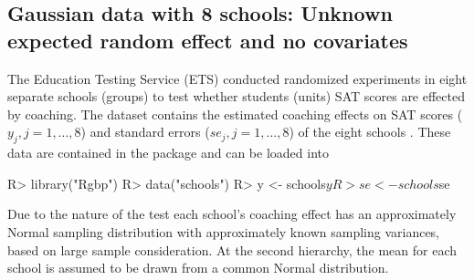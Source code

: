 \documentclass[article]{jss}
\begin{document}



\subsection[Unknown Second-level Mean and No Covariate]{Gaussian data with 8 schools: Unknown expected random effect and no covariates} \label{sec:ex:8schools}

The Education Testing Service (ETS) conducted randomized experiments in eight
separate schools (groups) to test whether students (units) SAT scores are
effected by coaching. The dataset contains the estimated coaching effects on SAT
scores ($y_{j}, j=1, \ldots, 8$) and standard errors ($se_{j}, j=1, \ldots, 8$)
of the eight schools \citep{1981}. These data are contained in the package and can be loaded into 
\begin{CodeChunk}
\begin{CodeInput}
R> library("Rgbp")
R> data("schools")
R> y  <- schools$y
R> se <- schools$se
\end{CodeInput}
\end{CodeChunk}


Due to the nature of the test each school's coaching effect has an approximately Normal sampling distribution with approximately known sampling variances, based on large sample consideration.  At the second hierarchy, the mean for each school is assumed to be drawn from a common Normal distribution.
\end{document}
